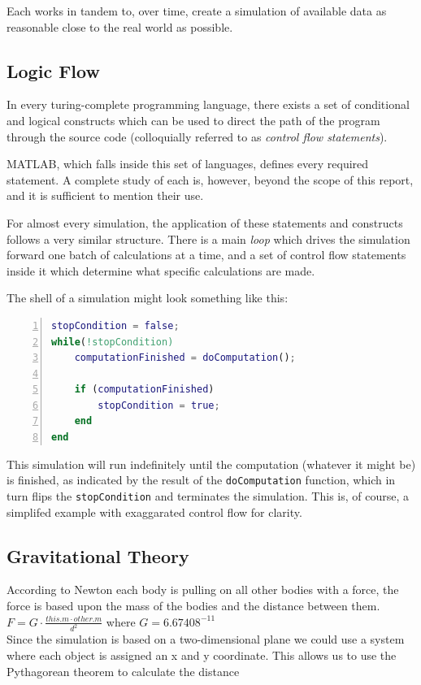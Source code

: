 \documentclass[11pt]{article}
\begin{document}
Each works in tandem to, over time, create a simulation of available data as reasonable close to the real 
world as possible.
\subsection{Logic Flow}
In every turing-complete programming language, there exists a set of conditional and logical constructs
which can be used to direct the path of the program through the source code (colloquially referred to as \emph{control flow statements}). 

MATLAB, which falls inside this set of languages, defines every required statement. A complete study of each is, however, beyond the scope of this report, and it is sufficient to mention their use.

For almost every simulation, the application of these statements and constructs follows a very similar structure. There is a main \emph{loop} which drives the simulation forward one batch of calculations at a time, and a set of control flow statements inside it which determine what specific calculations are made.

The shell of a simulation might look something like this:
\pagebreak
\begin{lstlisting}[language=Matlab, tabsize=4, numbers=left, frame=shadowbox]
stopCondition = false;
while(!stopCondition)
	computationFinished = doComputation();
	
	if (computationFinished)
		stopCondition = true;
	end
end
\end{lstlisting}
This simulation will run indefinitely until the computation (whatever it might be) is finished, as indicated by
the result of the \verb|doComputation| function, which in turn flips the \verb|stopCondition| and terminates the 
simulation. This is, of course, a simplifed example with exaggarated control flow for clarity.

\subsection{Gravitational Theory}
According to Newton each body is pulling on all other bodies with a force, the force is based upon the mass of the bodies and the distance between them.\\

$F = G \cdot \frac{this.m \cdot other.m}{d^{2}}$
where $G = 6.67408^{-11}$\\

Since the simulation is based on a two-dimensional plane we could use a system where each object is assigned an x and y coordinate. This allows us to use the Pythagorean theorem to calculate the distance \\
\end{document}
